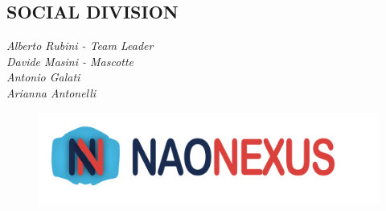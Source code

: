 \documentclass{optica-article}
\begin{document}
\bigskip

\subsection{SOCIAL DIVISION}

\noindent\emph{Alberto Rubini - Team Leader}\\
\emph{Davide Masini - Mascotte}\\
\emph{Antonio Galati}\\
\emph{Arianna Antonelli}\\


\begin{figure}[b]
    \centering
    \includegraphics[scale=0.04]{figures/logo.png}
    \label{fig:logo_con_scritta}
\end{figure}


\end{document}
